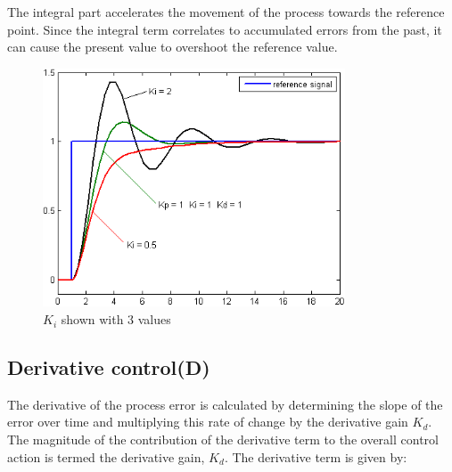The integral part accelerates the movement of the process towards the reference point.
Since the integral term correlates to accumulated errors from the past, it can cause the present value to overshoot the reference value.
\begin{figure}[h!]
  \centering
  \includegraphics[width=0.8\textwidth]{figures/Change_with_Ki.png}
  
  \caption{$K_i$ shown with 3 values} 
  \label{PID controller}
\end{figure}

\newpage

\subsection {Derivative control(D)} 
The derivative of the process error is calculated by determining the slope of the error over time and multiplying this rate of change by the derivative gain $K_d$. The magnitude of the contribution of the derivative term to the overall control action is termed the derivative gain, $K_d$. The derivative term is given by:

